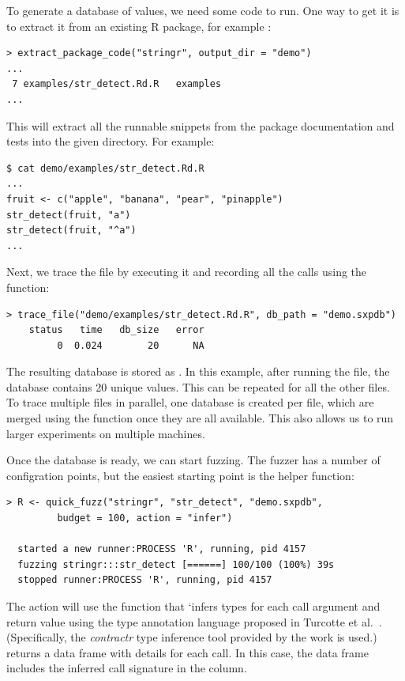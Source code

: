 \documentclass[sigplan,screen]{acmart}
\begin{document}
To generate a database of values, we need some code to run.
One way to get it is to extract it from an existing R package, for example :

\begin{lstlisting}
> extract_package_code("stringr", output_dir = "demo")
...
 7 examples/str_detect.Rd.R   examples
...
\end{lstlisting}

This will extract all the runnable snippets from the package documentation and tests into the given directory.
For example:

\begin{lstlisting}
$ cat demo/examples/str_detect.Rd.R
...
fruit <- c("apple", "banana", "pear", "pinapple")
str_detect(fruit, "a")
str_detect(fruit, "^a")
...
\end{lstlisting}

Next, we trace the file by executing it and recording all the calls using the  function:

\begin{lstlisting}
> trace_file("demo/examples/str_detect.Rd.R", db_path = "demo.sxpdb")
    status   time   db_size   error
         0  0.024        20      NA
\end{lstlisting}

The resulting database is stored as . 
In this example, after running the  file, the database contains 20 unique values. 
This can be repeated for all the other files. 
To trace multiple files in parallel, one database is created per file, which are merged using the  function once they are all available.
This also allows us to run larger experiments on multiple machines.

Once the database is ready, we can start fuzzing.
The fuzzer has a number of configration points, but the easiest starting point is the  helper function:

\begin{lstlisting}
> R <- quick_fuzz("stringr", "str_detect", "demo.sxpdb",
		 budget = 100, action = "infer")

  started a new runner:PROCESS 'R', running, pid 4157
  fuzzing stringr:::str_detect [======] 100/100 (100%) 39s
  stopped runner:PROCESS 'R', running, pid 4157
\end{lstlisting}

The  action will use the  function that `infers types for each call argument and return value using the type annotation language proposed in Turcotte et al.~\cite{turcotte2020designing}.
(Specifically, the \emph{contractr} type inference tool provided by the work is used.)
 returns a data frame with details for each call.
In this case, the data frame includes the inferred call signature in the  column. %
\end{document}
